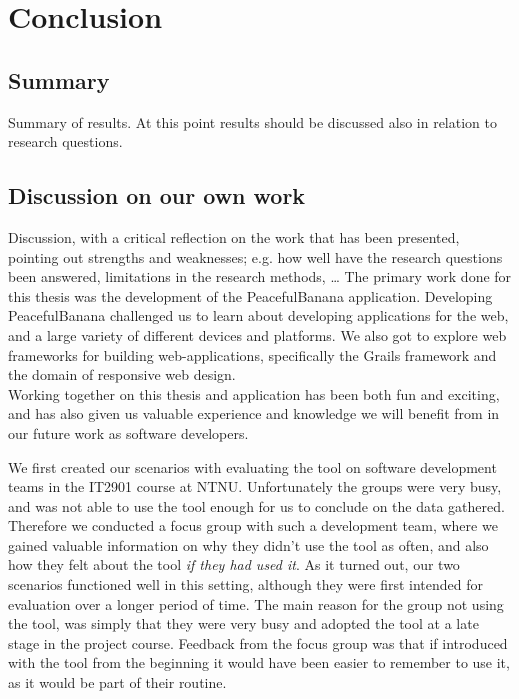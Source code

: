 \chapter{Conclusion}

\section{Summary}
Summary of results. At this point results should be discussed also in
relation to research questions.

\section{Discussion on our own work}
Discussion, with a critical reflection on the work that has been presented,
pointing out strengths and weaknesses; e.g. how well have the research questions been answered, limitations in the research methods, …
The primary work done for this thesis was the development of the PeacefulBanana application. Developing PeacefulBanana challenged us to learn about developing applications for the web, and a large variety of different devices and platforms. We also got to explore web frameworks for building web-applications, specifically the Grails framework and the domain of responsive web design. \\
Working together on this thesis and application has been both fun and exciting, and has also given us valuable experience and knowledge we will benefit from in our future work as software developers.

We first created our scenarios with evaluating the tool on software development teams in the IT2901 course at NTNU. Unfortunately the groups were very busy, and was not able to use the tool enough for us to conclude on the data gathered. Therefore we conducted a focus group with such a development team, where we gained valuable information on why they didn't use the tool as often, and also how they felt about the tool \emph{if they had used it}. As it turned out, our two scenarios functioned well in this setting, although they were first intended for evaluation over a longer period of time. The main reason for the group not using the tool, was simply that they were very busy and adopted the tool at a late stage in the project course. Feedback from the focus group was that if introduced with the tool from the beginning it would have been easier to remember to use it, as it would be part of their routine. 


